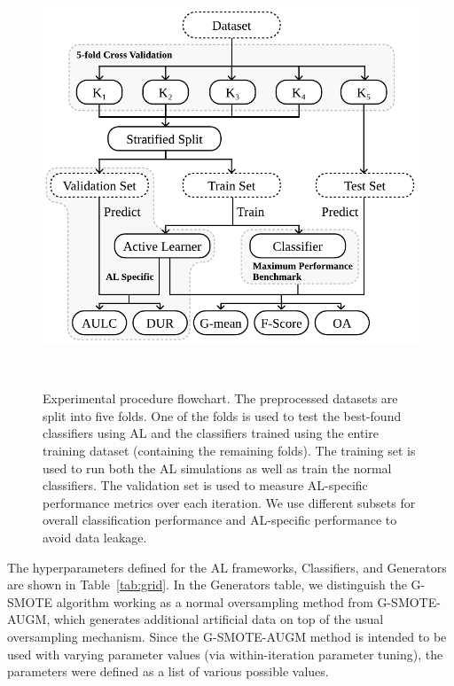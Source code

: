 \documentclass[10pt,journal,compsoc]{IEEEtran}
\begin{document}
\begin{figure}[H]
	\centering
	\includegraphics[width=\linewidth]{../analysis/experimental_procedure}
    \caption{%
        Experimental procedure flowchart. The preprocessed datasets are split
        into five folds. One of the folds is used to test the best-found
        classifiers using AL and the classifiers trained using the entire
        training dataset (containing the remaining folds). The training set is
        used to run both the AL simulations as well as train the normal
        classifiers. The validation set is used to measure AL-specific
        performance metrics over each iteration. We use different subsets for
        overall classification performance and AL-specific performance to
        avoid data leakage.
    }~\label{fig:experimental_procedure}
\end{figure}

The hyperparameters defined for the AL frameworks, Classifiers, and Generators
are shown in Table~\ref{tab:grid}. In the Generators table, we distinguish the
G-SMOTE algorithm working as a normal oversampling method from G-SMOTE-AUGM,
which generates additional artificial data on top of the usual oversampling
mechanism. Since the G-SMOTE-AUGM method is intended to be used with varying
parameter values (via within-iteration parameter tuning), the parameters were
defined as a list of various possible values.
\end{document}
